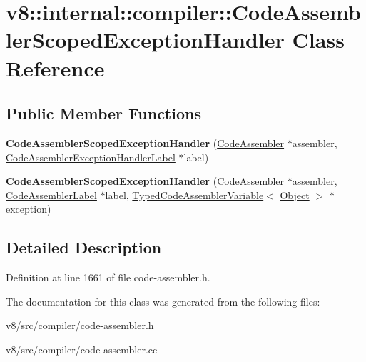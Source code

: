 \hypertarget{classv8_1_1internal_1_1compiler_1_1CodeAssemblerScopedExceptionHandler}{}\section{v8\+:\+:internal\+:\+:compiler\+:\+:Code\+Assembler\+Scoped\+Exception\+Handler Class Reference}
\label{classv8_1_1internal_1_1compiler_1_1CodeAssemblerScopedExceptionHandler}
\subsection*{Public Member Functions}
\begin{DoxyCompactItemize}
\item 
\mbox{\label{classv8_1_1internal_1_1compiler_1_1CodeAssemblerScopedExceptionHandler_a517516bb6229b4ab8e4ed867eeb149b3}} 
{\bfseries Code\+Assembler\+Scoped\+Exception\+Handler} (\mbox{\hyperlink{classv8_1_1internal_1_1compiler_1_1CodeAssembler}{Code\+Assembler}} $\ast$assembler, \mbox{\hyperlink{classv8_1_1internal_1_1compiler_1_1CodeAssemblerParameterizedLabel}{Code\+Assembler\+Exception\+Handler\+Label}} $\ast$label)
\item 
\mbox{\label{classv8_1_1internal_1_1compiler_1_1CodeAssemblerScopedExceptionHandler_ad500952280cb7aeb5eebf1d3bd42fbef}} 
{\bfseries Code\+Assembler\+Scoped\+Exception\+Handler} (\mbox{\hyperlink{classv8_1_1internal_1_1compiler_1_1CodeAssembler}{Code\+Assembler}} $\ast$assembler, \mbox{\hyperlink{classv8_1_1internal_1_1compiler_1_1CodeAssemblerLabel}{Code\+Assembler\+Label}} $\ast$label, \mbox{\hyperlink{classv8_1_1internal_1_1compiler_1_1TypedCodeAssemblerVariable}{Typed\+Code\+Assembler\+Variable}}$<$ \mbox{\hyperlink{classv8_1_1internal_1_1Object}{Object}} $>$ $\ast$exception)
\end{DoxyCompactItemize}


\subsection{Detailed Description}


Definition at line 1661 of file code-\/assembler.\+h.



The documentation for this class was generated from the following files\+:\begin{DoxyCompactItemize}
\item 
v8/src/compiler/code-\/assembler.\+h\item 
v8/src/compiler/code-\/assembler.\+cc\end{DoxyCompactItemize}
